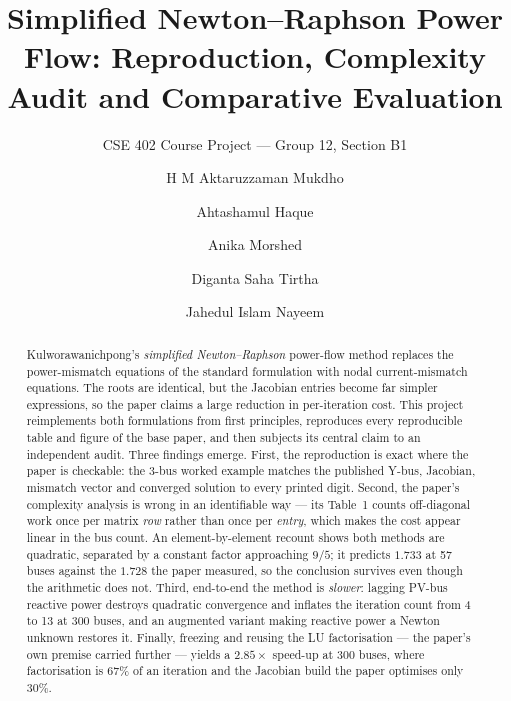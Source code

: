 \documentclass[sigconf,nonacm]{acmart}
\begin{document}
\title{Simplified Newton--Raphson Power Flow: Reproduction,
       Complexity Audit and Comparative Evaluation}
\subtitle{CSE 402 Course Project --- Group 12, Section B1}

\author{H M Aktaruzzaman Mukdho}

\author{Ahtashamul Haque}

\author{Anika Morshed}

\author{Diganta Saha Tirtha}

\author{Jahedul Islam Nayeem}

\thispagestyle{firstpage}

\begin{abstract}
Kulworawanichpong's \emph{simplified Newton--Raphson} power-flow method replaces
the power-mismatch equations of the standard formulation with nodal
current-mismatch equations. The roots are identical, but the Jacobian entries
become far simpler expressions, so the paper claims a large reduction in
per-iteration cost. This project reimplements both formulations from first
principles, reproduces every reproducible table and figure of the base paper,
and then subjects its central claim to an independent audit. Three findings
emerge. First, the reproduction is exact where the paper is checkable: the
3-bus worked example matches the published Y-bus, Jacobian, mismatch vector and
converged solution to every printed digit. Second, the paper's complexity
analysis is wrong in an identifiable way --- its Table~1 counts off-diagonal
work once per matrix \emph{row} rather than once per \emph{entry}, which makes
the cost appear linear in the bus count. An element-by-element recount shows
both methods are quadratic, separated by a constant factor approaching $9/5$; it
predicts $1.733$ at 57 buses against the $1.728$ the paper measured, so the
conclusion survives even though the arithmetic does not. Third, end-to-end the
method is \emph{slower}: lagging PV-bus reactive power destroys quadratic
convergence and inflates the iteration count from 4 to 13 at 300 buses, and an
augmented variant making reactive power a Newton unknown restores it. Finally,
freezing and reusing the LU factorisation --- the paper's own premise carried
further --- yields a $2.85\times$ speed-up at 300 buses, where factorisation is
$67\%$ of an iteration and the Jacobian build the paper optimises only $30\%$.
\end{abstract}
\end{document}
